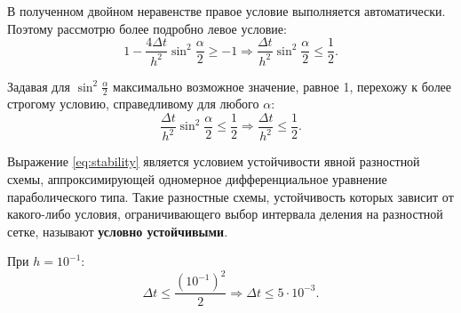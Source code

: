 \documentclass[12pt, a4paper]{report}
\begin{document}
	\par
	В полученном двойном неравенстве правое условие выполняется автоматически. Поэтому рассмотрю более подробно левое условие:
	\begin{equation*}
		1 - \frac{4 \Delta t}{h^{2}}\sin^{2}{\frac{\alpha}{2}} \geq -1 \Rightarrow \frac{\Delta t}{h^{2}}\sin^{2}{\frac{\alpha}{2}} \leq \frac{1}{2}.
	\end{equation*}
	\par
	Задавая для $\sin^{2}{\frac{\alpha}{2}}$ максимально возможное значение, равное 1, перехожу к более строгому условию, справедливому для любого $\alpha$:
	\begin{equation}\label{eq:stability}
		\frac{\Delta t}{h^{2}}\sin^{2}{\frac{\alpha}{2}} \leq \frac{1}{2} \Rightarrow \frac{\Delta t}{h^{2}} \leq \frac{1}{2}.
	\end{equation}
	\par
	Выражение \eqref{eq:stability} является условием устойчивости явной разностной схемы, аппроксимирующей одномерное дифференциальное уравнение параболического типа. Такие разностные схемы, устойчивость которых зависит от какого-либо условия, ограничивающего выбор интервала деления на разностной сетке, называют \textbf{условно устойчивыми}. \par
	При $h = 10^{-1}$:
	\begin{equation*}
		\Delta t \leq \frac{(10^{-1})^{2}}{2} \Rightarrow \Delta t \leq 5 \cdot 10^{-3}.
	\end{equation*}
\end{document}
